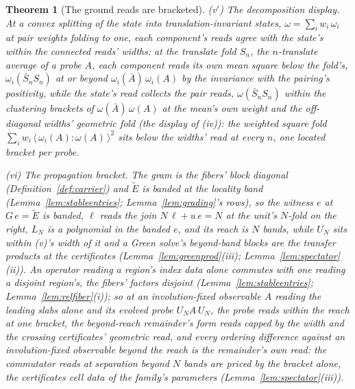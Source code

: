 \documentclass[11pt]{article}
\newtheorem{theorem}{Theorem}
\theoremstyle{definition}
\begin{document}
\begin{theorem}[The ground reads are bracketed]
\emph{(v$'$) The decomposition display.} At a convex splitting
of the state into translation-invariant states,
$\omega=\sum_iw_i\,\omega_i$ at pair weights folding to one,
each component's reads agree with the state's within the
connected reads' widths: at the translate fold
$S_n$, the $n$-translate average of a probe $A$, each
component reads its own mean square below the fold's,
$\omega_i(\bar S_nS_n)$ at or beyond
$\omega_i(\bar A)\,\omega_i(A)$ by the invariance with the
pairing's positivity, while the state's read collects the pair
reads, $\omega(\bar S_nS_n)$ within the clustering brackets of
$\omega(\bar A)\,\omega(A)$ at the mean's own weight and the
off-diagonal widths' geometric fold (the display of (iv)): the
weighted square fold
$\sum_iw_i\,\langle\,\omega_i(A)\!:\!\omega(A)\,\rangle^2$ sits
below the widths' read at every $n$, one located bracket per
probe.

\emph{(vi) The propagation bracket.} The gram is the fibers' block
diagonal (Definition~\ref{def:carrier}) and $\tilde E$ is banded at the
locality band (Lemma~\ref{lem:stableentries}; Lemma~\ref{lem:grading}'s
rows), so the witness $e$ at $G\,e=\tilde E$ is banded, $\ell$ reads
the join $N\,\ell+u\,e=N$ at the unit's $N$-fold on the right, $L_N$
is a polynomial in the banded
$e$, and its reach is $N$ bands, while $U_N$ sits
within (v)'s width of it and a Green solve's beyond-band blocks
are the transfer products at the certificates
(Lemma~\ref{lem:greenprod}(iii); Lemma~\ref{lem:spectator}(ii)).
An operator reading a region's index data alone commutes with one
reading a disjoint region's, the fibers' factors disjoint
(Lemma~\ref{lem:stableentries}; Lemma~\ref{lem:relfiber}(i)); so
at an involution-fixed observable $A$ reading the leading slabs
alone and its \emph{evolved probe} $U_NA\,U_N$, the probe reads
within the reach at one bracket, the beyond-reach remainder's
form reads capped by the width and the crossing certificates'
geometric read, and every ordering difference against an
involution-fixed observable beyond the reach is the remainder's
own read: the commutator reads at separation beyond $N$ bands are
priced by the bracket alone, the certificates cell data of the
family's parameters (Lemma~\ref{lem:spectator}(iii)).


\end{theorem}
\end{document}
